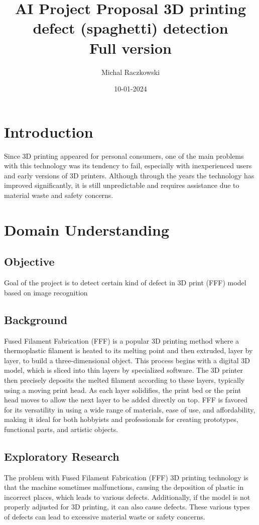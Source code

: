 \documentclass[12pt,a4paper]{article}
\title{{\textbf{AI Project Proposal 3D printing defect (spaghetti) detection}}\\ {\small Full version}}
\author{Michal Raczkowski}
\date{10-01-2024}
\begin{document}
\maketitle
\thispagestyle{empty} %

\newpage
\tableofcontents
\newpage

\setcounter{page}{1} %

\section{Introduction}
Since 3D printing appeared for personal consumers, one of the main problems with this technology was its tendency to fail, especially with inexperienced users and early versions of 3D printers. Although through the years the technology has improved significantly, it is still unpredictable and requires assistance due to material waste and safety concerns.

\section{Domain Understanding}
\subsection{Objective}
Goal of the project is to detect certain kind of defect in 3D print (FFF) model based on image recognition
\subsection{Background}
Fused Filament Fabrication (FFF) is a popular 3D printing method where a thermoplastic filament is heated to its melting point and then extruded, layer by layer, to build a three-dimensional object. This process begins with a digital 3D model, which is sliced into thin layers by specialized software. The 3D printer then precisely deposits the melted filament according to these layers, typically using a moving print head. As each layer solidifies, the print bed or the print head moves to allow the next layer to be added directly on top. FFF is favored for its versatility in using a wide range of materials, ease of use, and affordability, making it ideal for both hobbyists and professionals for creating prototypes, functional parts, and artistic objects.
\subsection{Exploratory Research}
The problem with Fused Filament Fabrication (FFF) 3D printing technology is that the machine sometimes malfunctions, causing the deposition of plastic in incorrect places, which leads to various defects. Additionally, if the model is not properly adjusted for 3D printing, it can also cause defects. These various types of defects can lead to excessive material waste or safety concerns.
\end{document}
